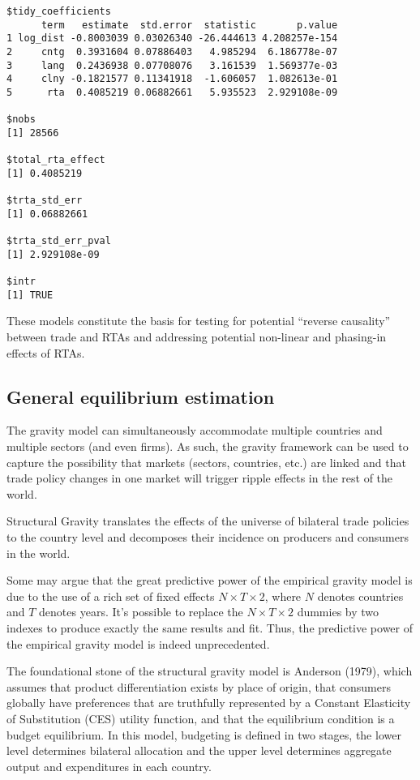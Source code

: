 \documentclass[12pt,reqno,oneside,pdftex]{formato-puc/puctesis} %
\begin{document}
\begin{verbatim}
$tidy_coefficients
      term   estimate  std.error  statistic       p.value
1 log_dist -0.8003039 0.03026340 -26.444613 4.208257e-154
2     cntg  0.3931604 0.07886403   4.985294  6.186778e-07
3     lang  0.2436938 0.07708076   3.161539  1.569377e-03
4     clny -0.1821577 0.11341918  -1.606057  1.082613e-01
5      rta  0.4085219 0.06882661   5.935523  2.929108e-09

$nobs
[1] 28566

$total_rta_effect
[1] 0.4085219

$trta_std_err
[1] 0.06882661

$trta_std_err_pval
[1] 2.929108e-09

$intr
[1] TRUE
\end{verbatim}

These models constitute the basis for testing for potential ``reverse
causality'' between trade and RTAs and addressing potential non-linear
and phasing-in effects of RTAs.

\hypertarget{general-equilibrium-estimation}{%
\subsection{General equilibrium
estimation}\label{general-equilibrium-estimation}}

The gravity model can simultaneously accommodate multiple countries and
multiple sectors (and even firms). As such, the gravity framework can be
used to capture the possibility that markets (sectors, countries, etc.)
are linked and that trade policy changes in one market will trigger
ripple effects in the rest of the world.

Structural Gravity translates the effects of the universe of bilateral
trade policies to the country level and decomposes their incidence on
producers and consumers in the world.

Some may argue that the great predictive power of the empirical gravity
model is due to the use of a rich set of fixed effects
\(N \times T \times 2\), where \(N\) denotes countries and \(T\) denotes
years. It's possible to replace the \(N \times T \times 2\) dummies by
two indexes to produce exactly the same results and fit. Thus, the
predictive power of the empirical gravity model is indeed unprecedented.

The foundational stone of the structural gravity model is Anderson
(1979), which assumes that product differentiation exists by place of
origin, that consumers globally have preferences that are truthfully
represented by a Constant Elasticity of Substitution (CES) utility
function, and that the equilibrium condition is a budget equilibrium. In
this model, budgeting is defined in two stages, the lower level
determines bilateral allocation and the upper level determines aggregate
output and expenditures in each country.
\end{document}
